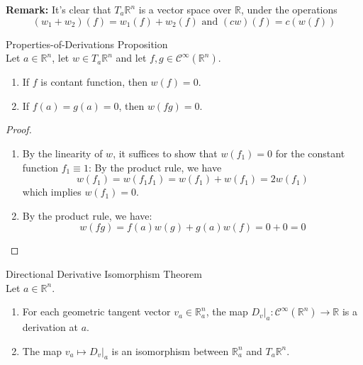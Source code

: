 \noindent\textbf{Remark:} It's clear that $T_a\mathbb{R}^n$ is a vector space over $\mathbb{R}$, under the operations
\[
(w_1+w_2) (f)=w_1(f)+w_2(f) \text{ and } (cw)(f)= c(w(f))
\]

\begin{proposition}{Properties-of-Derivations Proposition}\\
Let $a\in \mathbb{R}^n$, let $w\in T_a \mathbb{R}^n$ and let $f,g \in \mathcal{C}^\infty(\mathbb{R}^n)$.
\begin{enumerate}
    \item If $f$ is contant function, then $w(f)=0$.
    \item If $f(a)=g(a)=0$, then $w(fg)=0$.
\end{enumerate}
\end{proposition}

\begin{proof}
    \begin{enumerate}
        \item By the linearity of $w$, it suffices to show that $w(f_1)=0$ for the constant function $f_1 \equiv 1$: By the product rule, we have
        \[
        w(f_1)= w(f_1f_1)=w(f_1)+w(f_1)=2w(f_1)
        \]
        which implies $w(f_1)=0$.

        \item By the product rule, we have:
        \[
        w(fg)=f(a)w(g)+g(a)w(f)=0+0=0
        \]
    \end{enumerate}
\end{proof}


\begin{theorem}{Directional Derivative Isomorphism Theorem}\\
Let $a\in \mathbb{R}^n$.
\begin{enumerate}
    \item For each geometric tangent vector $v_a \in \mathbb{R}_a^n$, the map $D_v|_a :\mathcal{C}^\infty (\mathbb{R}^n) \to \mathbb{R}$ is a derivation at $a$.
    \item The map $v_a \mapsto D_v|_a$ is an isomorphism between $\mathbb{R}_a^n$ and $T_a \mathbb{R}^n$.
\end{enumerate}
\end{theorem}

